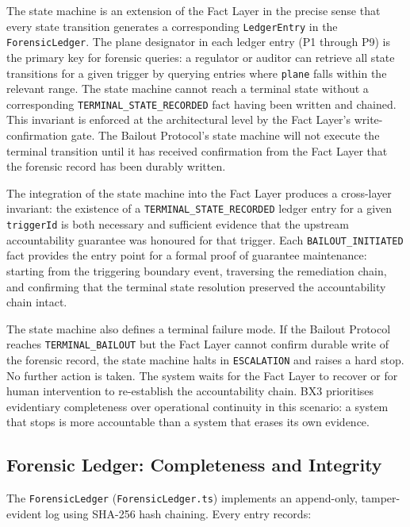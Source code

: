 The state machine is an extension of the Fact Layer in the precise sense that every state transition generates a corresponding \texttt{LedgerEntry} in the \texttt{ForensicLedger}. The plane designator in each ledger entry (P1 through P9) is the primary key for forensic queries: a regulator or auditor can retrieve all state transitions for a given trigger by querying entries where \texttt{plane} falls within the relevant range. The state machine cannot reach a terminal state without a corresponding \texttt{TERMINAL\_STATE\_RECORDED} fact having been written and chained. This invariant is enforced at the architectural level by the Fact Layer's write-confirmation gate. The Bailout Protocol's state machine will not execute the terminal transition until it has received confirmation from the Fact Layer that the forensic record has been durably written.

The integration of the state machine into the Fact Layer produces a cross-layer invariant: the existence of a \texttt{TERMINAL\_STATE\_RECORDED} ledger entry for a given \texttt{triggerId} is both necessary and sufficient evidence that the upstream accountability guarantee was honoured for that trigger. Each \texttt{BAILOUT\_INITIATED} fact provides the entry point for a formal proof of guarantee maintenance: starting from the triggering boundary event, traversing the remediation chain, and confirming that the terminal state resolution preserved the accountability chain intact.

The state machine also defines a terminal failure mode. If the Bailout Protocol reaches \texttt{TERMINAL\_BAILOUT} but the Fact Layer cannot confirm durable write of the forensic record, the state machine halts in \texttt{ESCALATION} and raises a hard stop. No further action is taken. The system waits for the Fact Layer to recover or for human intervention to re-establish the accountability chain. BX3 prioritises evidentiary completeness over operational continuity in this scenario: a system that stops is more accountable than a system that erases its own evidence.

\subsection{Forensic Ledger: Completeness and Integrity}
\label{sec:forensic-ledger}

The \texttt{ForensicLedger} (\texttt{ForensicLedger.ts}) implements an append-only, tamper-evident log using SHA-256 hash chaining. Every entry records:

